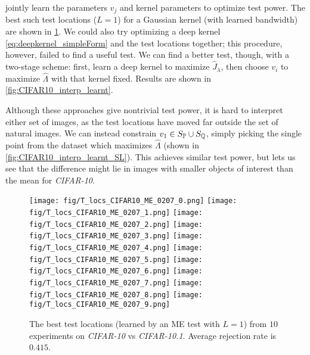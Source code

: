 \documentclass{article}
\begin{document}
 jointly learn the parameters $v_j$ and kernel parameters to optimize test power.
The best such test locations ($L = 1$) for a Gaussian kernel (with learned bandwidth) are shown in \cref{fig:CIFAR10_interp_learnt_ME}.
We could also try optimizing a deep kernel \eqref{eq:deepkernel_simpleForm} and the test locations together;
this procedure, however, failed to find a useful test.
We can find a better test, though, with a two-stage scheme:
first, learn a deep kernel to maximize $\hat J_\lambda$,
then choose $v_i$ to maximize $\hat\Lambda$ with that kernel fixed.
Results are shown in \cref{fig:CIFAR10_interp_learnt}.

Although these approaches give nontrivial test power,
it is hard to interpret either set of images,
as the test locations have moved far outside the set of natural images.
We can instead constrain $v_1 \in S_{\mathbb{P}} \cup S_{\mathbb{Q}}$,
simply picking the single point from the dataset which maximizes $\hat\Lambda$
(shown in \cref{fig:CIFAR10_interp_learnt_SL}).
This achieves similar test power,
but lets us see that the difference might lie in images with smaller objects of interest than the mean for \emph{CIFAR-10}.

\begin{figure}[!p]
    \begin{center}
        \subfigure
        {\texttt{[image: fig/T\_locs\_CIFAR10\_ME\_0207\_0.png]}}
        \subfigure
        {\texttt{[image: fig/T\_locs\_CIFAR10\_ME\_0207\_1.png]}}
        \subfigure
        {\texttt{[image: fig/T\_locs\_CIFAR10\_ME\_0207\_2.png]}}
        \subfigure
        {\texttt{[image: fig/T\_locs\_CIFAR10\_ME\_0207\_3.png]}}
        \subfigure
        {\texttt{[image: fig/T\_locs\_CIFAR10\_ME\_0207\_4.png]}}
        \subfigure
        {\texttt{[image: fig/T\_locs\_CIFAR10\_ME\_0207\_5.png]}}
        \subfigure
        {\texttt{[image: fig/T\_locs\_CIFAR10\_ME\_0207\_6.png]}}
        \subfigure
        {\texttt{[image: fig/T\_locs\_CIFAR10\_ME\_0207\_7.png]}}
        \subfigure
        {\texttt{[image: fig/T\_locs\_CIFAR10\_ME\_0207\_8.png]}}
        \subfigure
        {\texttt{[image: fig/T\_locs\_CIFAR10\_ME\_0207\_9.png]}}
        \caption{The best test locations (learned by an ME test with $L=1$) from $10$ experiments on \emph{CIFAR-10} vs \emph{CIFAR-10.1}. Average rejection rate is $0.415$.}  \label{fig:CIFAR10_interp_learnt_ME}
    \end{center}
    \vspace{-0.5cm}
\end{figure}
\end{document}
